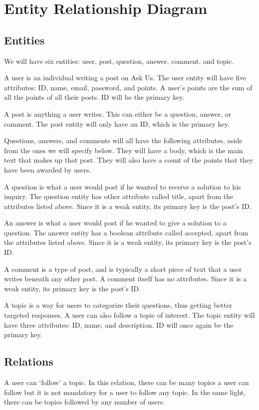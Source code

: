 \section{Entity Relationship Diagram}
\subsection{Entities}
We will have six entities: user, post, question, answer, comment, and topic.

A user is an individual writing a post on Ask Us. The user entity will have five attributes: ID, name, email, password, and points. A user's points are the sum of all the points of all their posts. ID will be the primary key.

A post is anything a user writes. This can either be a question, answer, or comment. The post entity will only have an ID, which is the primary key.

Questions, answers, and comments will all have the following attributes, aside from the ones we will specify below. They will have a body, which is the main text that makes up that post. They will also have a count of the points that they have been awarded by users.

A question is what a user would post if he wanted to receive a solution to his inquiry. The question entity has other attribute called title, apart from the attributes listed above. Since it is a weak entity, its primary key is the post's ID.

An answer is what a user would post if he wanted to give a solution to a question. The answer entity has a boolean attribute called accepted, apart from the attributes listed above. Since it is a weak entity, its primary key is the post's ID.

A comment is a type of post, and is typically a short piece of text that a user writes beneath any other post. A comment itself has no attributes. Since it is a weak entity, its primary key is the post's ID.

A topic is a way for users to categorize their questions, thus getting better targeted responses. A user can also follow a topic of interest. The topic entity will have three attributes: ID, name, and description. ID will once again be the primary key.

\subsection{Relations}
A user can `follow' a topic. In this relation, there can be many topics a user can follow but it is not mandatory for a user to follow any topic. In the same light, there can be topics followed by any number of users.

